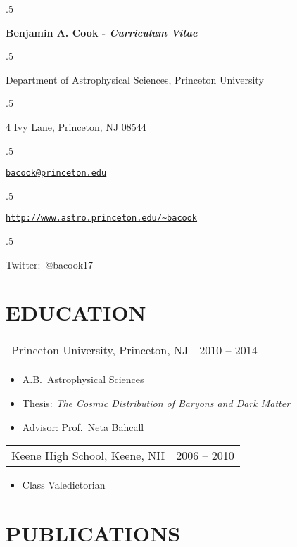 \documentclass[margin]{res}
\newcommand\mancenter[1]{\moveleft.5\hoffset\centerline{#1}}
\begin{document}
  
\mancenter{\huge \bf{Benjamin A. Cook} -
  \textit{Curriculum Vitae}} \mancenter{\large Department of
  Astrophysical Sciences, Princeton University} \mancenter{\large 4
  Ivy Lane, Princeton, NJ 08544}
\mancenter{\large\tt\href{mailto:bacook@princeton.edu}{bacook@princeton.edu}}
\mancenter{\large\tt\url{http://www.astro.princeton.edu/~bacook}}
\mancenter{\large Twitter:~@bacook17}
\begin{resume}                        
 
 
\section{EDUCATION}       

\begin{tabular}{@{}p{4in} r@{}}
  Princeton University, Princeton, NJ & 2010 -- 2014
\end{tabular}
\begin{itemize} \itemsep -2pt
\item[] A.B.~Astrophysical Sciences
\item[] Thesis: \textit{The Cosmic Distribution of
  Baryons and Dark Matter}
\item[] Advisor: Prof.~Neta Bahcall
\end{itemize}

\begin{tabular}{@{}p{4in} r@{}}
  Keene High School, Keene, NH & 2006 -- 2010
\end{tabular}
\begin{itemize} \itemsep -2pt
\item[] Class Valedictorian
\end{itemize}

\section{PUBLICATIONS}


\end{resume}
\end{document}
